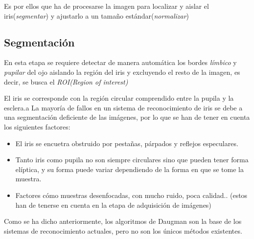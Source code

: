 Es por ellos que ha de procesarse la imagen para localizar y aislar el iris(\emph{segmentar}) y ajustarlo a un tamaño estándar(\emph{normalizar})


\subsection{Segmentación}
En esta etapa se requiere detectar de manera automática los bordes \emph{límbico} y \emph{pupilar} del ojo aislando la región del iris y excluyendo el resto de la imagen, es decir, se busca el \emph{ROI(Region of interest)}

El iris se corresponde con la región circular comprendido entre la pupila y la esclera.a
La mayoría de fallos en un sistema de reconocimiento de iris se debe a una segmentación deficiente de las imágenes, por lo que se han de tener en cuenta los siguientes factores:
\begin{itemize}
    \item El iris se encuetra obstruido por pestañas, párpados y reflejos especulares.
    \item Tanto iris como pupila no son siempre circulares sino que pueden tener forma elíptica, y su forma puede variar dependiendo de la forma en que se tome la muestra.
    \item Factores cómo muestras desenfocadas, con mucho ruido, poca calidad.. (estos han de tenerse en cuenta en la etapa de adquisición de imágenes)
\end{itemize}

Como se ha dicho anteriormente, los algoritmos de Daugman son la base de los sistemas de reconocimiento actuales, pero no son los únicos métodos existentes.

